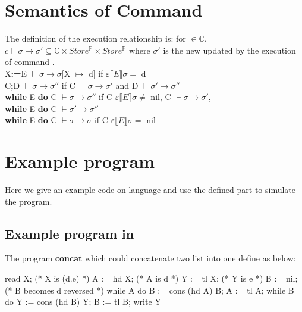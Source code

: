 \section{Semantics of Command}\label{appendix:semantics of command}
The definition of the execution relationship is: for  $\in \mathds{C}$, $c \vdash \sigma \rightarrow \sigma' \subseteq \mathds{C} \times Store^{\mathds{P}} \times Store^{\mathds{P}}$ where $\sigma'$ is the new  updated by the execution of command .\\
X\textbf{:=}E $\vdash\sigma \rightarrow \sigma[$X $\mapsto$ d$]$ \hspace{1.15cm}if \hspace{0.2cm} $\varepsilon \llbracket E \rrbracket \sigma = $ d\\
C\textbf{;}D $\vdash\sigma \rightarrow \sigma''$ \hspace{2.8cm}if \hspace{0.2cm} C $\vdash\sigma \rightarrow \sigma'$ and D $\vdash\sigma' \rightarrow \sigma''$\\
\textbf{while} E \textbf{do} C $\vdash\sigma \rightarrow \sigma''$ \hspace{0.95cm}if \hspace{0.2cm} C $\varepsilon \llbracket E \rrbracket \sigma \neq $ nil, C $\vdash\sigma \rightarrow \sigma'$,\\ \indent\hspace{8.3cm}\textbf{while} E \textbf{do} C $\vdash\sigma' \rightarrow \sigma''$\\
\textbf{while} E \textbf{do} C $\vdash\sigma \rightarrow \sigma$ \hspace{1.15cm}if \hspace{0.2cm} C $\varepsilon \llbracket E \rrbracket\sigma = $ nil\\

\section{Example \WHILE program}\label{appendix:while example}
Here we give an example code on \WHILE language and use the defined part to simulate the program. 
\subsection{Example \WHILE program in \WHILE}
The \WHILE program \textbf{concat} which could concatenate two list into one define as below:
\begin{code}
read X; (* X is (d.e) *)
  A := hd X; (* A is d *)
  Y := tl X; (* Y is e *)
  B := nil; (* B becomes d reversed *)
  while A do
    B := cons (hd A) B;
    A := tl A;
  while B do
    Y := cons (hd B) Y;
    B := tl B;
write Y
\end{code}

